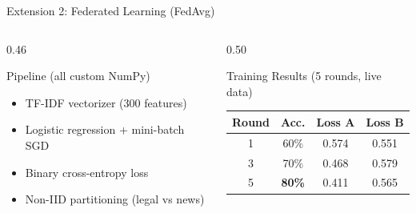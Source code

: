 \documentclass[aspectratio=1610, 11pt]{beamer}
\begin{document}
\begin{frame}{Extension 2: Federated Learning (FedAvg)}
\begin{center}
{%
}
\end{center}
\vspace{-0.4em}
\begin{columns}[T]
\begin{column}{0.46\textwidth}
\begin{block}{Pipeline (all custom NumPy)}
\tiny
\begin{itemize}\setlength\itemsep{0pt}
  \item TF-IDF vectorizer (300 features)
  \item Logistic regression + mini-batch SGD
  \item Binary cross-entropy loss
  \item Non-IID partitioning (legal vs news)
\end{itemize}
\end{block}
\end{column}
\begin{column}{0.50\textwidth}
\begin{exampleblock}{Training Results (5 rounds, live data)}
\tiny
\begin{tabular}{cccc}
\toprule
\textbf{Round} & \textbf{Acc.} & \textbf{Loss A} & \textbf{Loss B} \\
\midrule
1 & 60\% & 0.574 & 0.551 \\
3 & 70\% & 0.468 & 0.579 \\
5 & \textbf{80\%} & 0.411 & 0.565 \\
\bottomrule
\end{tabular}
\end{exampleblock}
\end{column}
\end{columns}
\end{frame}
\end{document}
